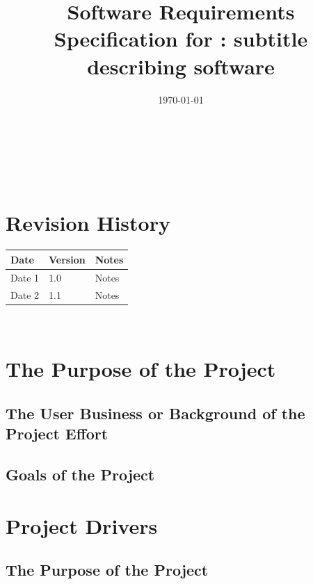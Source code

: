 \documentclass[12pt]{article}
\begin{document}
\title{Software Requirements Specification for \progname: subtitle describing software} 
\author{\authname}
\date{\today}
	
\maketitle

~\newpage


\tableofcontents

~\newpage

\section*{Revision History}

\begin{tabularx}{\textwidth}{p{3cm}p{2cm}X}
\toprule {\bf Date} & {\bf Version} & {\bf Notes}\\
\midrule
Date 1 & 1.0 & Notes\\
Date 2 & 1.1 & Notes\\
\bottomrule
\end{tabularx}

~\newpage


\section{The Purpose of the Project}
\subsection{The User Business or Background of the Project Effort}
\subsection{Goals of the Project}


\section{Project Drivers}
\subsection{The Purpose of the Project}
\end{document}

